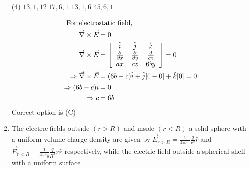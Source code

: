 \begin{enumerate}[label=\color{ocre}\textbf{\arabic*.}]
\begin{tasks}(4)
\task[\textbf{A.}]$13,1,12$ 
\task[\textbf{B.}]$17,6,1$
\task[\textbf{C.}]$13,1,6$
\task[\textbf{D.}]$45,6,1$
\end{tasks}
\begin{answer}
\begin{align*}
\intertext{ For electrostatic field,} 
\vec{\nabla} \times \vec{E}&=0\\
\vec{\nabla} \times \vec{E}&=\left[\begin{array}{ccc}
\hat{i} & \hat{j} & \hat{k} \\
\frac{\partial}{\partial x} & \frac{\partial}{\partial y} & \frac{\partial}{\partial z} \\
a x & c z & 6 b y
\end{array}\right]=0\\ \Rightarrow \vec{\nabla} \times \vec{E}&=(6 b-c) \hat{i}+\hat{j}[0-0]+\hat{k}[0]=0 \\
\Rightarrow(6 b-c) \hat{i}&=0 \\\Rightarrow c&=6 b
\end{align*}
Correct option is (C)
\end{answer}
\item The electric fields outside $(r>R)$ and inside $(r<R)$ a solid sphere with a uniform
volume charge density are given by $\vec{E}_{r>R}=\frac{1}{4 \pi \varepsilon_{0}} \frac{q}{r^{2}} \hat{r}$ and $\vec{E}_{r<R}=\frac{1}{4 \pi \varepsilon_{0}} \frac{q}{R^{3}} r \hat{r}$
respectively, while the electric field outside a spherical shell with a uniform surface

\end{enumerate}
